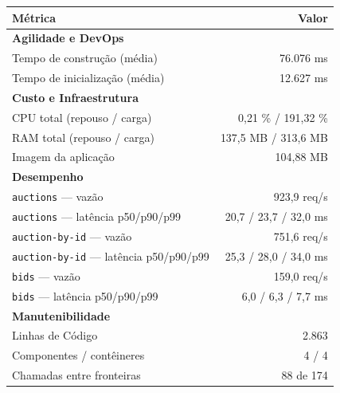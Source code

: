 \begin{quadro}[htb]
  \centering
  \caption{Métricas do sistema de leilões no baseline (Snapshot 0).}
  \label{qua:metricas-leilao-s0}
  \renewcommand{\arraystretch}{1.15}
  \begin{tabular}{|l|r|}
    \hline
    \textbf{Métrica} & \textbf{Valor} \\ \hline
    \multicolumn{2}{|l|}{\textbf{Agilidade e DevOps}} \\ \hline
    Tempo de construção (média) & 76.076 ms \\
    Tempo de inicialização (média) & 12.627 ms \\ \hline
    \multicolumn{2}{|l|}{\textbf{Custo e Infraestrutura}} \\ \hline
    CPU total (repouso / carga) & 0,21 \% / 191,32 \% \\
    RAM total (repouso / carga) & 137,5 MB / 313,6 MB \\
    Imagem da aplicação & 104,88 MB \\ \hline
    \multicolumn{2}{|l|}{\textbf{Desempenho}} \\ \hline
    \texttt{auctions} --- vazão & 923,9 req/s \\
    \texttt{auctions} --- latência p50/p90/p99 & 20,7 / 23,7 / 32,0 ms \\
    \texttt{auction-by-id} --- vazão & 751,6 req/s \\
    \texttt{auction-by-id} --- latência p50/p90/p99 & 25,3 / 28,0 / 34,0 ms \\
    \texttt{bids} --- vazão & 159,0 req/s \\
    \texttt{bids} --- latência p50/p90/p99 & 6,0 / 6,3 / 7,7 ms \\ \hline
    \multicolumn{2}{|l|}{\textbf{Manutenibilidade}} \\ \hline
    Linhas de Código & 2.863 \\
    Componentes / contêineres & 4 / 4 \\
    Chamadas entre fronteiras & 88 de 174 \\ \hline
  \end{tabular}
\end{quadro}
